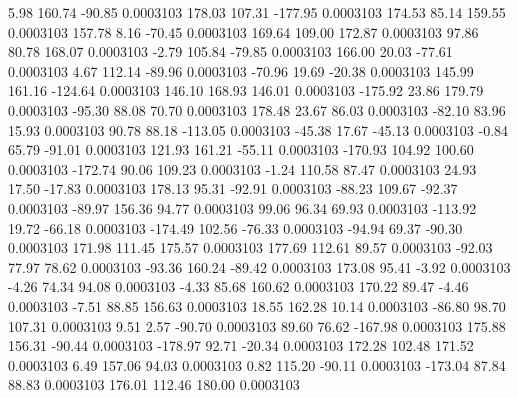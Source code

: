         5.98      160.74      -90.85     0.0003103
      178.03      107.31     -177.95     0.0003103
      174.53       85.14      159.55     0.0003103
      157.78        8.16      -70.45     0.0003103
      169.64      109.00      172.87     0.0003103
       97.86       80.78      168.07     0.0003103
       -2.79      105.84      -79.85     0.0003103
      166.00       20.03      -77.61     0.0003103
        4.67      112.14      -89.96     0.0003103
      -70.96       19.69      -20.38     0.0003103
      145.99      161.16     -124.64     0.0003103
      146.10      168.93      146.01     0.0003103
     -175.92       23.86      179.79     0.0003103
      -95.30       88.08       70.70     0.0003103
      178.48       23.67       86.03     0.0003103
      -82.10       83.96       15.93     0.0003103
       90.78       88.18     -113.05     0.0003103
      -45.38       17.67      -45.13     0.0003103
       -0.84       65.79      -91.01     0.0003103
      121.93      161.21      -55.11     0.0003103
     -170.93      104.92      100.60     0.0003103
     -172.74       90.06      109.23     0.0003103
       -1.24      110.58       87.47     0.0003103
       24.93       17.50      -17.83     0.0003103
      178.13       95.31      -92.91     0.0003103
      -88.23      109.67      -92.37     0.0003103
      -89.97      156.36       94.77     0.0003103
       99.06       96.34       69.93     0.0003103
     -113.92       19.72      -66.18     0.0003103
     -174.49      102.56      -76.33     0.0003103
      -94.94       69.37      -90.30     0.0003103
      171.98      111.45      175.57     0.0003103
      177.69      112.61       89.57     0.0003103
      -92.03       77.97       78.62     0.0003103
      -93.36      160.24      -89.42     0.0003103
      173.08       95.41       -3.92     0.0003103
       -4.26       74.34       94.08     0.0003103
       -4.33       85.68      160.62     0.0003103
      170.22       89.47       -4.46     0.0003103
       -7.51       88.85      156.63     0.0003103
       18.55      162.28       10.14     0.0003103
      -86.80       98.70      107.31     0.0003103
        9.51        2.57      -90.70     0.0003103
       89.60       76.62     -167.98     0.0003103
      175.88      156.31      -90.44     0.0003103
     -178.97       92.71      -20.34     0.0003103
      172.28      102.48      171.52     0.0003103
        6.49      157.06       94.03     0.0003103
        0.82      115.20      -90.11     0.0003103
     -173.04       87.84       88.83     0.0003103
      176.01      112.46      180.00     0.0003103
